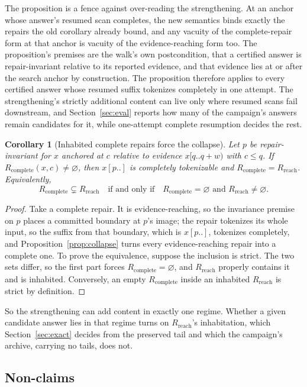 \documentclass[11pt,a4paper]{article}
\theoremstyle{definition}
\theoremstyle{plain}
\newtheorem{corollary}{Corollary}
\theoremstyle{remark}
\newcommand{\Rreach}{R_{\mathrm{reach}}}
\newcommand{\Rcomp}{R_{\mathrm{complete}}}
\newcommand{\suffix}[2]{#1[#2..]}
\newcommand{\window}[3]{#1[#2..#3)}
\begin{document}
The proposition is a fence against over-reading the strengthening. At an anchor whose answer's resumed scan completes,
the new semantics binds exactly the repairs the old corollary already bound, and any vacuity of the complete-repair form
at that anchor is vacuity of the evidence-reaching form too. The proposition's premises are the walk's own
postcondition, that a certified answer is repair-invariant relative to its reported evidence, and that evidence lies at
or after the search anchor by construction. The proposition therefore applies to every certified answer whose resumed
suffix tokenizes completely in one attempt. The strengthening's strictly additional content can live only where resumed
scans fail downstream, and Section~\ref{sec:eval} reports how many of the campaign's answers remain candidates for it,
while one-attempt complete resumption decides the rest.

\begin{corollary}[Inhabited complete repairs force the collapse]
\label{cor:dichotomy}
Let $p$ be repair-invariant for $x$ anchored at $c$ relative to evidence $\window{x}{q}{q+w}$ with $c \le q$. If
$\Rcomp(x, c) \ne \varnothing$, then $\suffix{x}{p}$ is completely tokenizable and $\Rcomp = \Rreach$. Equivalently,
\[
\Rcomp \subsetneq \Rreach \quad\text{if and only if}\quad \Rcomp = \varnothing \text{ and } \Rreach \ne \varnothing.
\]
\end{corollary}

\begin{proof}
Take a complete repair. It is evidence-reaching, so the invariance premise on $p$ places a committed boundary at $p$'s
image; the repair tokenizes its whole input, so the suffix from that boundary, which is $\suffix{x}{p}$, tokenizes
completely, and Proposition~\ref{prop:collapse} turns every evidence-reaching repair into a complete one. To prove the
equivalence, suppose the inclusion is strict. The two sets differ, so the first part forces $\Rcomp = \varnothing$, and
$\Rreach$ properly contains it and is inhabited. Conversely, an empty $\Rcomp$ inside an inhabited $\Rreach$ is strict
by definition.
\end{proof}

So the strengthening can add content in exactly one regime. Whether a given candidate answer lies in that regime turns
on $\Rreach$'s inhabitation, which Section~\ref{sec:exact} decides from the preserved tail and which the campaign's
archive, carrying no tails, does not.

\subsection{Non-claims}
\end{document}

